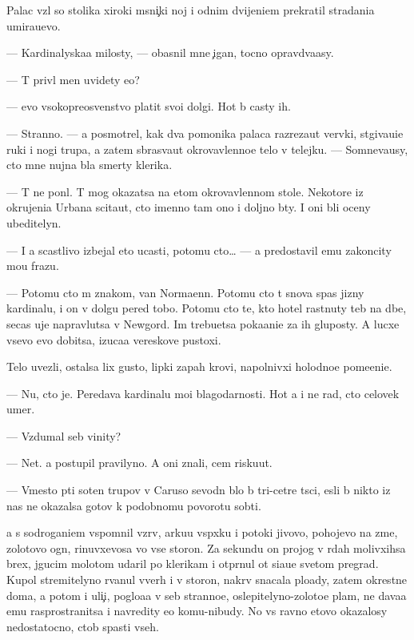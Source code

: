 \documentclass[10pt]{book}
\begin{document}
Palac vz{\ia}l so stolika xiroki{\y} m{\ia}sni{\c}ki{\y} noj i odnim dvijeni{\y}em prekratil stra\-da\-ni\-{\y}a umira{\y}u{\x}evo.

— Kardinalyska{\y}a milosty, — ob{\y}asnil mne {\c}igan, tocno opravd{\yi}va{\y}asy.

— T{\yi} priv{\e}l men{\ia} uvidety {\y}e{\y}o?

— {\Y}evo v{\yi}sokopreosv{\ia}{\x}enstvo platit svo{\y}i dolgi. Hot{\ia} b{\yi} casty ih.

— Stranno. — {\Y}a posmotrel, kak dva pomo{\x}nika palaca razreza{\y}ut ver{\e}vki, st{\ia}gi\-va\-{\y}u\-{\x}i\-{\y}e ruki i nogi trupa, a zatem sbras{\yi}va{\y}ut okrovavlenno{\y}e telo v telejku. — Somneva{\y}usy, cto mne nujna b{\yi}la smerty klerika.

— T{\yi} ne pon{\ia}l. T{\yi} mog okazatsa na etom okrovavlennom stole. Nekotor{\yi}{\y}e iz okrujeni{\y}a Urbana scita{\y}ut, cto imenno tam ono i doljno b{\yi}ty. I oni b{\yi}li oceny ubeditelyn{\yi}.

— I {\y}a scastlivo izbejal eto{\y} ucasti, potomu cto… — {\Y}a predostavil {\y}emu zakoncity mo{\y}u frazu.

— Potomu cto m{\yi} znakom{\yi}, van Normaenn. Potomu cto t{\yi} snova spas jizny kardinalu, i on v dolgu pered tobo{\y}. Potomu cto te, kto hotel rast{\ia}nuty teb{\ia} na d{\yi}be, se{\y}cas uje napravl{\ia}{\y}utsa v Newgord. Im trebu{\y}etsa poka{\y}ani{\y}e za ih gluposty. A lucxe vsevo {\y}evo dobitsa, izuca{\y}a vereskov{\yi}{\y}e pustoxi.

Telo uvezli, ostalsa lix gusto{\y}, lipki{\y} zapah krovi, napolnivxi{\y} holodno{\y}e po\-me\-{\x}e\-ni\-{\y}e.

— Nu, cto je. Peredava{\y} kardinalu mo{\y}i blagodarnosti. Hot{\ia} {\y}a i ne rad, cto celovek umer.

— Vzdumal seb{\ia} vinity?

— Net. {\Y}a postupil pravilyno. A oni znali, cem risku{\y}ut.

— Vmesto p{\ia}ti soten trupov v Caruso sevodn{\ia} b{\yi}lo b{\yi} tri-cet{\yi}re t{\yi}s{\ia}ci, {\y}esli b{\yi} nikto iz nas ne okazalsa gotov k podobnomu povorotu sob{\yi}ti{\y}.

{\Y}a s sodrogani{\y}em vspomnil vzr{\yi}v, {\y}arku{\y}u vsp{\yi}xku i potoki jivovo, pohojevo na zme{\y}, zolotovo ogn{\ia}, rinuvxevosa vo vse storon{\yi}. Za sekundu on projog v r{\ia}dah molivxihsa brex, jgucim molotom udaril po klerikam i otpr{\ia}nul ot si{\y}a{\y}u{\x}e{\y} svetom pregrad{\yi}. Kupol stremitelyno rvanul vverh i v storon{\yi}, nakr{\yi}v snacala plo{\x}ady, zatem okrestn{\yi}{\y}e doma, a potom i uli{\c}i, poglo{\x}a{\y}a v seb{\ia} stranno{\y}e, oslepitelyno-zoloto{\y}e plam{\ia}, ne dava{\y}a {\y}emu rasprostranitsa i navredity {\y}e{\x}o komu-nibudy. No vs{\e} ravno etovo okazalosy nedostatocno, ctob{\yi} spasti vseh.
\end{document}
